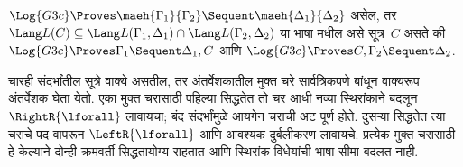 \begin{lem}[माएहाराचे उपप्रमेय]\label{pt:cut:itp:lem:maehara}
$\Log{G3c}
\Proves \maeh{\Gamma_1}{\Gamma_2} \Sequent \maeh{\Delta_1}{\Delta_2}$
असेल, तर $\Lang L(C)
\subseteq \Lang L(\Gamma_1,
\Delta_1) \cap \Lang L(\Gamma_2, \Delta_2)$
या भाषा मधील असे सूत्र~$C$ असते की
$\Log{G3c}
\Proves \Gamma_1 \Sequent \Delta_1, C$ आणि
$\Log{G3c} \Proves C,
\Gamma_2 \Sequent \Delta_2$.
\end{lem}
चारही संदर्भांतील सूत्रे वाक्ये असतील, तर अंतर्वेशकातील
मुक्त चरे सार्वत्रिकपणे बांधून वाक्यरूप अंतर्वेशक घेता येतो.
एका मुक्त चरासाठी पहिल्या सिद्धतेत तो चर आधी नव्या
स्थिरांकाने बदलून $\RightR{\lforall}$ लावायचा; बंद संदर्भांमुळे
आयगेन चराची अट पूर्ण होते. दुसऱ्या सिद्धतेत त्या चराचे
पद वापरून $\LeftR{\lforall}$ आणि आवश्यक दुर्बलीकरण लावायचे.
प्रत्येक मुक्त चरासाठी हे केल्याने दोन्ही क्रमवर्ती सिद्धतायोग्य
राहतात आणि स्थिरांक-विधेयांची भाषा-सीमा बदलत नाही.


